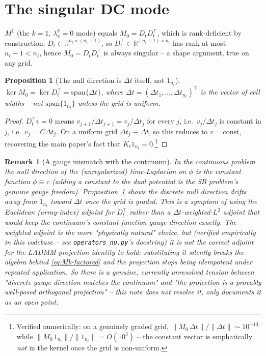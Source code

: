 \documentclass[11pt]{article}
\newtheorem{proposition}{Proposition}
\newtheorem{remark}{Remark}
\newcommand{\dt}{\Delta t}
\newcommand{\RR}{\mathbb{R}}
\newcommand{\code}[1]{\texttt{#1}}
\newcommand{\lx}{\lambda_x^k}
\begin{document}
\section{The singular DC mode}
\label{sec:dc-mode}

$M^1$ (the $k{=}1$, $\lx=0$ mode) equals $M_0=D_tD_t^\top$, which is rank-deficient by
construction: $D_t\in\RR^{n_t\times(n_t-1)}$, so $D_t^\top\in\RR^{(n_t-1)\times n_t}$ has rank at
most $n_t-1<n_t$, hence $M_0=D_tD_t^\top$ is always singular -- a shape argument, true on any
grid.

\begin{proposition}[The null direction is $\dt$ itself, not $1_{n_t}$]
\label{prop:kernel}
$\ker M_0 = \ker D_t^\top = \mathrm{span}\{\dt\}$, where $\dt=(\dt_1,\dots,\dt_{n_t})^\top$ is
the vector of cell widths -- \emph{not} $\mathrm{span}\{1_{n_t}\}$ unless the grid is uniform.
\end{proposition}
\begin{proof}
$D_t^\top v=0$ means $v_{j+1}/\dt_{j+1}=v_j/\dt_j$ for every $j$, i.e.\ $v_j/\dt_j$ is constant
in $j$, i.e.\ $v_j = C\dt_j$. On a uniform grid $\dt_j\equiv\dt$, so this reduces to
$v=\mathrm{const}$, recovering the main paper's fact that $K_t1_{n_t}=0$.\footnote{Verified
numerically: on a genuinely graded grid, $\|M_0\,\dt\|/\|\dt\|\sim 10^{-13}$ while
$\|M_0\,1_{n_t}\|/\|1_{n_t}\|=O(10^3)$ -- the constant vector is emphatically \emph{not} in the
kernel once the grid is non-uniform.}
\end{proof}

\begin{remark}[A gauge mismatch with the continuum]
\label{rem:gauge}
In the continuous problem the null direction of the (unregularized) time-Laplacian on $\phi$ is
the constant function $\phi\equiv c$ (adding a constant to the dual potential is the SB
problem's genuine gauge freedom). Proposition~\ref{prop:kernel} shows the \emph{discrete} null
direction drifts away from $1_{n_t}$ toward $\dt$ once the grid is graded. This is a symptom of
using the \emph{Euclidean} (array-index) adjoint for $D_t^\top$ rather than a
$\dt$-weighted-$L^2$ adjoint that would keep the continuum's constant-function gauge direction
exactly. The weighted adjoint is the more "physically natural" choice, but (verified empirically
in this codebase -- see \code{operators\_nu.py}'s docstring) it is \emph{not} the correct adjoint
for the LADMM projection identity to hold: substituting it silently breaks the algebra behind
\eqref{eq:Mk-factored} and the projection stops being idempotent under repeated application. So
there is a genuine, currently unresolved tension between "discrete gauge direction matches the
continuum" and "the projection is a provably well-posed orthogonal projection" -- this note does
not resolve it, only documents it as an open point.
\end{remark}
\end{document}
